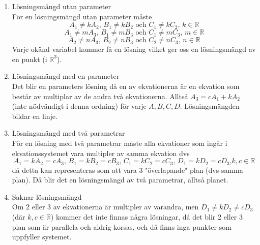 \begin{enumerate}[label=Fall \arabic*:]
    \item Lösningsmängd utan parameter\\
        För en lösningsmängd utan parameter måste 
        \begin{equation*}
            A_{1} \neq kA_{2}\text{, }B_{1} \neq kB_{2}\text{ och }C_{1} \neq kC_{2} \text{, }k\in\mathbb{R}
        \end{equation*}
        \begin{equation*}
            A_{1} \neq mA_{3}\text{, }B_{1} \neq mB_{3}\text{ och }C_{1} \neq mC_{3} \text{, }m\in\mathbb{R}
        \end{equation*}
        \begin{equation*}
            A_{2} \neq nA_{3}\text{, }B_{2} \neq nB_{3}\text{ och }C_{2} \neq nC_{3} \text{, }n\in\mathbb{R}
        \end{equation*}
        Varje okänd variabel kommer få en lösning vilket ger oss en lösningsmängd av en punkt (i $\mathbb{R}^{3}$).
    \item Lösningsmängd med en parameter\\
        Det blir en parameters lösning då en av ekvationerna är en ekvation som består av multiplar av de andra två ekvationerna.
        Alltså $A_{3}=cA_{1}+kA_{2}$ (inte nödvändigt i denna ordning) för varje $A,B,C,D$. Lösningsmängden bildar en linje.
        
    \item Lösningsmängd med två parametrar\\
        För en lösning med två parametrar måste alla ekvationer som ingår i ekvationssystemet vara multipler av samma ekvation dvs
        \begin{equation*}
            A_{1} = kA_{2} = cA_{3}\text{, }B_{1} = kB_{2} = cB_{3}\text{, }C_{1} = kC_{2} = cC_{3}\text{, }D_{1} = kD_{2} = cD_{3} \text{,} k,c\in\mathbb{R}
        \end{equation*}
        då detta kan representeras som att vara 3 "överlapande" plan (dvs samma plan). Då blir det en lösningsmängd av två parametrar, alltså planet.

    \item Saknar lösningsmängd\\
        Om 2 eller 3 av ekvationerna är multipler av varandra, 
        men $D_{1} \neq kD_{2} \neq cD_{3}$ (där $k,c\in\mathbb{R}$) kommer det inte finnas några lösningar,
        då det blir 2 eller 3 plan som är parallela och aldrig korsas, och då finns inga punkter som uppfyller systemet.
\end{enumerate}